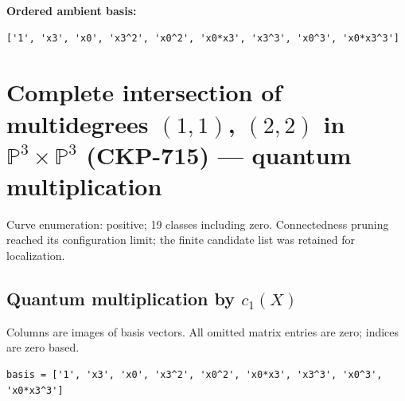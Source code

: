 \documentclass[10pt,a4paper]{article}
\begin{document}
\textbf{Ordered ambient basis:}
\begin{lstlisting}
['1', 'x3', 'x0', 'x3^2', 'x0^2', 'x0*x3', 'x3^3', 'x0^3', 'x0*x3^3']
\end{lstlisting}

\clearpage\section*{Complete intersection of multidegrees $(1,1)$, $(2,2)$ in $\mathbb P^{3}\times \mathbb P^{3}$ (CKP-715) --- quantum multiplication}

Curve enumeration: positive; 19 classes including zero.
Connectedness pruning reached its configuration limit; the finite candidate list was retained for localization.
\subsection*{Quantum multiplication by $c_1(X)$}
Columns are images of basis vectors. All omitted matrix entries are zero; indices are zero based.

\begin{lstlisting}
basis = ['1', 'x3', 'x0', 'x3^2', 'x0^2', 'x0*x3', 'x3^3', 'x0^3', 'x0*x3^3']
\end{lstlisting}
\end{document}

